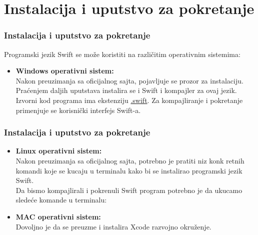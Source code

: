 \documentclass{beamer}
\begin{document}
\section{Instalacija i uputstvo za pokretanje}
\begin{frame}
\frametitle{Instalacija i uputstvo za pokretanje}

Programski jezik Swift se može koristiti na različitim operativnim sistemima:\\

\begin{itemize}

\item{\textbf{Windows operativni sistem:}}\\
Nakon preuzimanja sa oficijalnog sajta, pojavljuje se prozor za instalaciju. Praćenjem daljih uputstava instalira se i Swift i kompajler za ovaj jezik.\\

Izvorni kod programa ima ekstenziju \underline{.swift}. Za kompajliranje i pokretanje primenjuje se korisnički interfejs Swift-a.

\end{itemize}

\end{frame}

\begin{frame}
\frametitle{Instalacija i uputstvo za pokretanje}

\begin{itemize}

\item{\textbf{Linux operativni sistem:}}\\
Nakon preuzimanja sa oficijalnog sajta, potrebno je pratiti niz konk
retnih komandi koje se kucaju u terminalu kako bi se instalirao programski jezik Swift.\\

Da bismo kompajlirali i pokrenuli Swift program potrebno je da ukucamo sledeće komande u terminalu:


		   

\item{\textbf{MAC operativni sistem:}}\\
Dovoljno je da se preuzme i instalira Xcode razvojno okruženje.
\end{itemize}

\end{frame}
\end{document}
